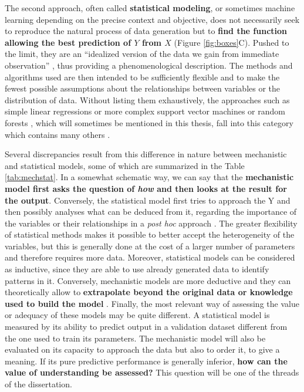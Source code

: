 \documentclass[a4paper,12pt,twoside,onecolumn,openright,final,oldfontcommands]{memoir}
\begin{document}
The second approach, often called \textbf{statistical modeling}, or
sometimes machine learning depending on the precise context and
objective, does not necessarily seek to reproduce the natural process of
data generation but to \textbf{find the function allowing the best
prediction of \(Y\) from \(X\)} (Figure \ref{fig:boxes}C). Pushed to the
limit, they are an ``idealized version of the data we gain from
immediate observation'' \citep{frigg2020models}, thus providing a
phenomenological description. The methods and algorithms used are then
intended to be sufficiently flexible and to make the fewest possible
assumptions about the relationships between variables or the
distribution of data. Without listing them exhaustively, the approaches
such as simple linear regressions or more complex support vector
machines \citep{cortes1995support} or random forests
\citep{breiman2001random}, which will sometimes be mentioned in this
thesis, fall into this category which contains many others
\citep{hastie2009elements}.

Several discrepancies result from this difference in nature between
mechanistic and statistical models, some of which are summarized in the
Table \ref{tab:mechstat}. In a somewhat schematic way, we can say that
the \textbf{mechanistic model first asks the question of \emph{how} and
then looks at the result for the output}. Conversely, the statistical
model first tries to approach the Y and then possibly analyses what can
be deduced from it, regarding the importance of the variables or their
relationships in a \emph{post hoc} approach
\citep{ishwaran2007variable, manica2019toward}. The greater flexibility
of statistical methods makes it possible to better accept the
heterogeneity of the variables, but this is generally done at the cost
of a larger number of parameters and therefore requires more data.
Moreover, statistical models can be considered as inductive, since they
are able to use already generated data to identify patterns in it.
Conversely, mechanistic models are more deductive and they can
theoretically allow to \textbf{extrapolate beyond the original data or
knowledge used to build the model} \citep{baker2018mechanistic}.
Finally, the most relevant way of assessing the value or adequacy of
these models may be quite different. A statistical model is measured by
its ability to predict output in a validation dataset different from the
one used to train its parameters. The mechanistic model will also be
evaluated on its capacity to approach the data but also to order it, to
give a meaning. If its pure predictive performance is generally
inferior, \textbf{how can the value of understanding be assessed?} This
question will be one of the threads of the dissertation.
\end{document}
